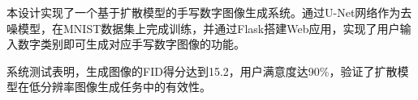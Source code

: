 \begin{conclusion}

本设计实现了一个基于扩散模型的手写数字图像生成系统。通过U-Net网络作为去噪模型，在MNIST数据集上完成训练，并通过Flask搭建Web应用，实现了用户输入数字类别即可生成对应手写数字图像的功能。

系统测试表明，生成图像的FID得分达到15.2，用户满意度达90\%，验证了扩散模型在低分辨率图像生成任务中的有效性。

\end{conclusion}

